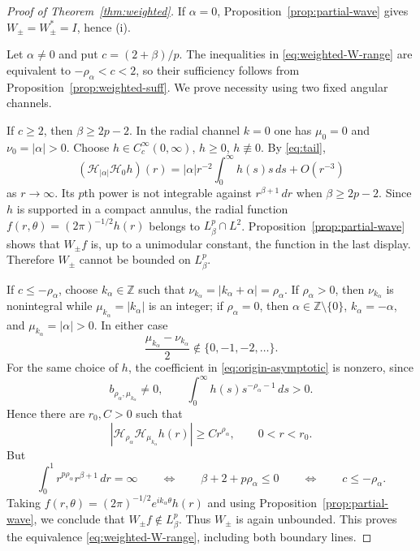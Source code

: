 \documentclass[11pt,a4paper,reqno,backref=page]{amsart}
\newcommand{\Z}{\mathbb Z}
\newcommand{\HH}{\mathcal H}                 %
\newcommand{\dd}{\,d}
\numberwithin{equation}{section}
\theoremstyle{definition}
\theoremstyle{remark}
\begin{document}
\begin{proof}[Proof of Theorem~\ref{thm:weighted}]
If $\alpha=0$, Proposition~\ref{prop:partial-wave} gives
$W_\pm=W_\pm^*=I$, hence (i).

Let $\alpha\ne0$ and put $c=(2+\beta)/p$. The inequalities in
\eqref{eq:weighted-W-range} are equivalent to
$-\rho_\alpha<c<2$, so their sufficiency follows from
Proposition~\ref{prop:weighted-suff}. We prove necessity using
two fixed angular channels.

If $c\ge2$, then $\beta\ge2p-2$. In the radial channel $k=0$ one
has $\mu_0=0$ and $\nu_0=|\alpha|>0$. Choose $h\in
C_c^\infty(0,\infty)$, $h\ge0$, $h\not\equiv0$. By
\eqref{eq:tail},
\begin{equation*}
  (\HH_{|\alpha|}\HH_0h)(r)
  =|\alpha|r^{-2}\int_0^\infty h(s)s\dd s+O(r^{-3})
\end{equation*}
as $r\to\infty$. Its $p$th power is not integrable against
$r^{\beta+1}\,dr$ when $\beta\ge2p-2$. Since $h$ is supported in
a compact annulus, the radial function
$f(r,\theta)=(2\pi)^{-1/2}h(r)$ belongs to $L^p_\beta\cap L^2$.
Proposition~\ref{prop:partial-wave} shows that $W_\pm f$ is, up
to a unimodular constant, the function in the last display.
Therefore $W_\pm$ cannot be bounded on $L^p_\beta$.

If $c\le-\rho_\alpha$, choose $k_\alpha\in\Z$ such that
$\nu_{k_\alpha}=|k_\alpha+\alpha|=\rho_\alpha$. If
$\rho_\alpha>0$, then $\nu_{k_\alpha}$ is nonintegral while
$\mu_{k_\alpha}=|k_\alpha|$ is an integer; if $\rho_\alpha=0$,
then $\alpha\in\Z\setminus\{0\}$, $k_\alpha=-\alpha$, and
$\mu_{k_\alpha}=|\alpha|>0$. In either case
\begin{equation*}
  \frac{\mu_{k_\alpha}-\nu_{k_\alpha}}2
  \notin\{0,-1,-2,\ldots\}.
\end{equation*}
For the same choice of $h$, the coefficient in
\eqref{eq:origin-asymptotic} is nonzero, since
\begin{equation*}
  b_{\rho_\alpha,\mu_{k_\alpha}}\neq0,\qquad
  \int_0^\infty h(s)s^{-\rho_\alpha-1}\dd s>0.
\end{equation*}
Hence there are $r_0,C>0$ such that
\begin{equation*}
  |\HH_{\rho_\alpha}\HH_{\mu_{k_\alpha}}h(r)|
  \ge C r^{\rho_\alpha},\qquad 0<r<r_0.
\end{equation*}
But
\begin{equation*}
  \int_0^1 r^{p\rho_\alpha}r^{\beta+1}\dd r=\infty
  \qquad\Longleftrightarrow\qquad
  \beta+2+p\rho_\alpha\le0
  \qquad\Longleftrightarrow\qquad
  c\le-\rho_\alpha.
\end{equation*}
Taking $f(r,\theta)=(2\pi)^{-1/2}e^{ik_\alpha\theta}h(r)$ and
using Proposition~\ref{prop:partial-wave}, we conclude that
$W_\pm f\notin L^p_\beta$. Thus $W_\pm$ is again unbounded. This
proves the equivalence \eqref{eq:weighted-W-range}, including
both boundary lines.


\end{proof}
\end{document}
